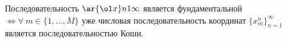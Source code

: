 
	 Последовательность $\ar {\ol x}n1\infty$ является фундаментальной $\iff \forall\ m\in\{1,\ldots,M\}$ уже числовая последовательность
	 координат $\big\{x_m^n\big\}_{n=1}^\infty$ является последовательностью Коши.
	 